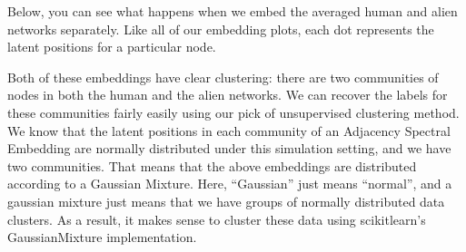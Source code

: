 \documentclass[letterpaper,10pt,english]{jupyterBook}
\begin{document}
\begin{sphinxVerbatim}[commandchars=\\\{\}]
     

  
  

  
  
  
\end{sphinxVerbatim}

\sphinxAtStartPar
Below, you can see what happens when we embed the averaged human and alien networks separately. Like all of our embedding plots, each dot represents the latent positions for a particular node.

\noindent{}

\sphinxAtStartPar
Both of these embeddings have clear clustering: there are two communities of nodes in both the human and the alien networks. We can recover the labels for these communities fairly easily using our pick of unsupervised clustering method. We know that the latent positions in each community of an Adjacency Spectral Embedding are normally distributed under this simulation setting, and we have two communities. That means that the above embeddings are distributed according to a Gaussian Mixture. Here, “Gaussian” just means “normal”, and a gaussian mixture just means that we have groups of normally distributed data clusters. As a result, it makes sense to cluster these data using scikit\sphinxhyphen{}learn’s GaussianMixture implementation.
\end{document}
